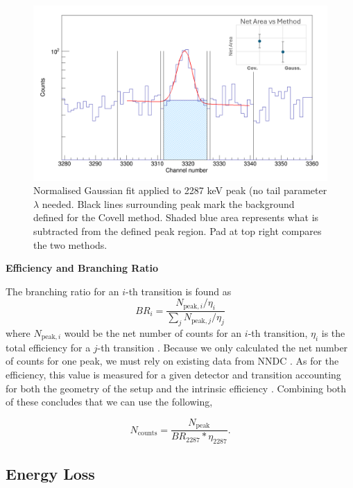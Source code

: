 \documentclass[a4paper,12pt]{article}
\begin{document}
\begin{figure}[H]
    \centering
    \includegraphics[width=16cm]{plot3.png}
    \caption{Normalised Gaussian fit applied to 2287 keV peak (no tail parameter $\lambda$ needed. Black lines surrounding peak mark the background defined for the Covell method.  Shaded blue area represents what is subtracted from the defined peak region.  Pad at top right compares the two methods.}
    \label{fig:plot}
\end{figure}

\textbf{Efficiency and Branching Ratio}

The branching ratio for an $i$-th transition is found as
\begin{equation}
BR_i = \frac{N_{\text{peak},i}/\eta_i}{\sum_j N_{\text{peak},j}/\eta_j}
\end{equation}
where $N_{\text{peak},i}$ would be the net number of counts for an $i$-th transition, $\eta_i$ is the total efficiency for a $j$-th transition \cite{chiara}.  Because we only calculated the net number of counts for one peak, we must rely on existing data from NNDC \cite{NNDCNuDat22Na}.  As for the efficiency, this value is measured for a given detector and transition accounting for both the geometry of the setup and the intrinsic efficiency \cite{masha2021}.  Combining both of these concludes that we can use the following,

\begin{equation}
        N_{\text{counts}} = \frac{N_{\text{peak}}}{BR_{2287}*\eta_{2287}}.
\end{equation}


\subsection{Energy Loss}\label{energy_loss}
\end{document}
